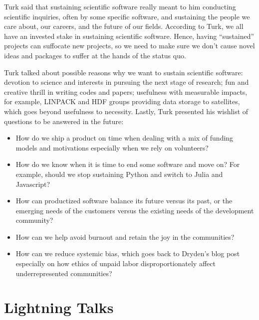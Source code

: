 \documentclass[11pt, oneside]{amsart}
\newcommand{\note}[1]{ {\textcolor{blueish}    { ***Note:      #1 }}}
\begin{document}
Turk said that sustaining scientific software really meant to him conducting
scientific inquiries, often by some specific software, and sustaining the people
we care about, our careers, and the future of our fields. According to Turk, we
all have an invested stake in sustaining scientific software. Hence, having
``sustained'' projects can suffocate new projects, so we need to make sure we
don't cause novel ideas and packages to suffer at the hands of the status quo.

Turk talked about possible reasons why we want to sustain scientific software:
devotion to science and interests in pursuing the next stage of research; fun
and creative thrill in writing codes and papers; usefulness with measurable
impacts, for example, LINPACK and HDF groups providing data storage to
satellites, which goes beyond usefulness to necessity. Lastly, Turk presented
his wishlist of questions to be answered in the future:
%
\begin{itemize} 

\item How do we ship a product on time when dealing with a mix of funding models
and motivations especially when we rely on volunteers?

\item How do we know when it is time to end some software and move on? For
example, should we stop sustaining Python and switch to Julia and Javascript?
 
\item How can productized software balance its future versus its past, or the
emerging needs of the customers versus the existing needs of the development
community?

\item How can we help avoid burnout and retain the joy in the communities?

\item How can we reduce systemic bias, which goes back to Dryden's blog post
especially on how ethics of unpaid labor disproportionately affect
underrepresented communities?

\end{itemize}

\section{Lightning Talks} \label{sec:lightning}
\begin{comment}
\note{
\href{http://wssspe.researchcomputing.org.uk/wssspe3/agenda/}{Slides.}}
\end{comment}
\end{document}
